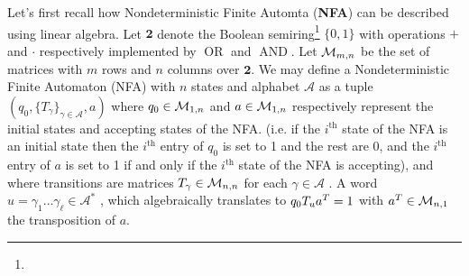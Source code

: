 Let's first recall how Nondeterministic Finite Automta (\textbf{NFA}) can be described using linear algebra. Let $\mathbf{2}$ denote the Boolean semiring\footnote{} $\{0,1\}$ with operations $+$ and $\cdot$ respectively implemented by $\operatorname{OR}$ and $\operatorname{AND}$.
Let $\mathcal{M}_{m,n}$ be the set of matrices with $m$ rows and $n$ columns over $\mathbf{2}$. We may define a Nondeterministic Finite Automaton (NFA) with $n$ states and alphabet $\mathcal{A}$ as a tuple $(q_0, \{T_\gamma\}_{\gamma \in \mathcal{A}}, a)$ where $q_0 \in \mathcal{M}_{1,n}$ and $a \in \mathcal{M}_{1,n}$ respectively represent the initial states and accepting states of the NFA. (i.e. if the $i^\text{th}$ state of the NFA is an initial state then the $i^\text{th}$ entry of $q_0$ is set to 1 and the rest are 0, and the $i^\text{th}$ entry of $a$ is set to 1 if and only if the $i^\text{th}$ state of the NFA is accepting), and where transitions are matrices $T_\gamma\in \mathcal{M}_{n,n}$ for each $\gamma\in\mathcal{A}$ . A word $u=\gamma_1\dots\gamma_\ell \in \mathcal{A}^*$ , which algebraically translates to $q_0 T_u a^T = 1$ with $a^T \in \mathcal{M}_{n,1}$ the transposition of $a$. 

